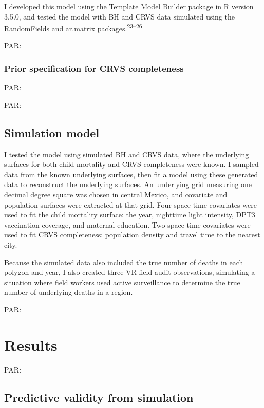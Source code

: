 \documentclass[
]{article}
\begin{document}
I developed this model using the Template Model Builder package in R version 3.5.0, and tested the model with BH and CRVS data simulated using the RandomFields and ar.matrix packages.\textsuperscript{\protect\hyperlink{ref-Kristensen2016}{23}--\protect\hyperlink{ref-Marquez2018}{26}}

PAR:

\hypertarget{prior-specification-for-crvs-completeness}{%
\subsubsection{Prior specification for CRVS completeness}\label{prior-specification-for-crvs-completeness}}

PAR:

PAR:

\hypertarget{simulation-model}{%
\subsection{Simulation model}\label{simulation-model}}

I tested the model using simulated BH and CRVS data, where the underlying surfaces for both child mortality and CRVS completeness were known. I sampled data from the known underlying surfaces, then fit a model using these generated data to reconstruct the underlying surfaces. An underlying grid measuring one decimal degree square was chosen in central Mexico, and covariate and population surfaces were extracted at that grid. Four space-time covariates were used to fit the child mortality surface: the year, nighttime light intensity, DPT3 vaccination coverage, and maternal education. Two space-time covariates were used to fit CRVS completeness: population density and travel time to the nearest city.

Because the simulated data also included the true number of deaths in each polygon and year, I also created three VR field audit observations, simulating a situation where field workers used active surveillance to determine the true number of underlying deaths in a region.

PAR:

\hypertarget{results}{%
\section{Results}\label{results}}

PAR:

\hypertarget{predictive-validity-from-simulation}{%
\subsection{Predictive validity from simulation}\label{predictive-validity-from-simulation}}
\end{document}
